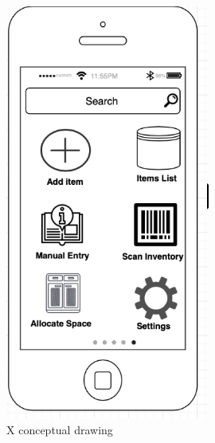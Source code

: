 \begin{figure}[h!]
	\centering
   	\includegraphics[width=0.60\textwidth]{images/product.PNG}
    \caption{X conceptual drawing}
\end{figure}
